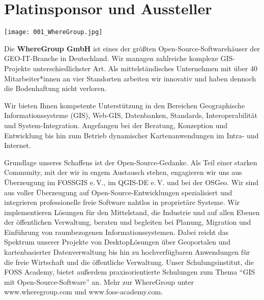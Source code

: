 \section*{Platinsponsor und Aussteller}
\begin{center}
  \centerline{\texttt{[image: 001\_WhereGroup.jpg]}}
\end{center}
\vspace*{-0.4cm}

\noindent
Die {\bfseries WhereGroup GmbH} ist eines der größten Open-Source-Soft\-ware\-häuser der GEO-IT-Branche in Deutschland. Wir managen zahlreiche komplexe GIS-Projekte unterschiedlichster Art. Als mittelständisches Unternehmen mit über 40 Mitarbeiter*innen an vier Standorten arbeiten wir innovativ und haben dennoch die Bodenhaftung nicht verloren.

\noindent
Wir bieten Ihnen kompetente Unterstützung in den Bereichen Geographische Informationssysteme (GIS), Web-GIS, Datenbanken, Standards, Interoperabilität und System-Integration. Angefangen bei der Beratung, Konzeption und Entwicklung bis hin zum Betrieb dynamischer Kartenanwendungen im Intra- und Internet.

\noindent
Grundlage unseres Schaffens ist der Open-Source-Gedanke. Als Teil einer starken Community, mit der wir in engem Austausch stehen, engagieren wir uns aus Überzeugung im FOSSGIS e.\,V., im QGIS-DE e.\,V. und bei der OSGeo. Wir sind aus voller Überzeugung auf Open-Source-Entwicklungen spezialisiert und integrieren professionelle freie Software nahtlos in proprietäre Systeme.
\noindent
Wir implementieren Lösungen für den Mittelstand, die Industrie und auf allen Ebenen der öffentlichen Verwaltung, beraten und begleiten bei Planung, Migration und Einführung von raumbezogenen Informationssystemen.
\noindent
Dabei reicht das Spektrum unserer Projekte von Desktop\-Lösungen über Geoportalen und kartenbasierter Datenverwaltung bis hin zu hochverfügbaren Anwendungen für die freie Wirtschaft und die öffentliche Verwaltung.
\noindent
Unser Schulungsinstitut, die FOSS Academy, bietet außerdem praxisorientierte Schulungen zum Thema "`GIS mit Open-Source-Software"' an.
\noindent
Mehr zur WhereGroup unter www.wheregroup.com und www.foss-academy.com.

